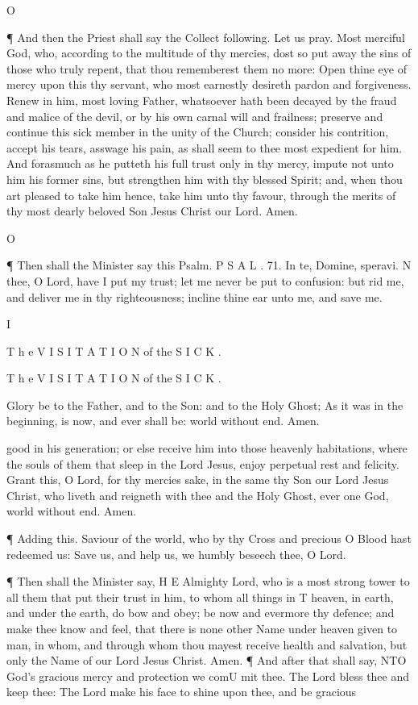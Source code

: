 O

¶ And then the Priest shall say the Collect following. Let us pray. Most merciful God, who, according to the multitude of thy mercies, dost so put away the sins of those who truly repent, that thou rememberest them no more: Open thine eye of mercy upon this thy servant, who most earnestly desireth pardon and forgiveness. Renew in him, most loving Father, whatsoever hath been decayed by the fraud and malice of the devil, or by his own carnal will and frailness; preserve and continue this sick member in the unity of the Church; consider his contrition, accept his tears, asswage his pain, as shall seem to thee most expedient for him. And forasmuch as he putteth his full trust only in thy mercy, impute not unto him his former sins, but strengthen him with thy blessed Spirit; and, when thou art pleased to take him hence, take him unto thy favour, through the merits of thy most dearly beloved Son Jesus Christ our Lord. Amen.

O

¶ Then shall the Minister say this Psalm. P S A L . 71. In te, Domine, speravi. N thee, O Lord, have I put my trust; let me never be put to confusion: but rid me, and deliver me in thy righteousness; incline thine ear unto me, and save me.

I

T h e V I S I T A T I O N of the S I C K .

T h e V I S I T A T I O N of the S I C K .

Glory be to the Father, and to the Son: and to the Holy Ghost; As it was in the beginning, is now, and ever shall be: world without end. Amen.

good in his generation; or else receive him into those heavenly habitations, where the souls of them that sleep in the Lord Jesus, enjoy perpetual rest and felicity. Grant this, O Lord, for thy mercies sake, in the same thy Son our Lord Jesus Christ, who liveth and reigneth with thee and the Holy Ghost, ever one God, world without end. Amen.

¶ Adding this. Saviour of the world, who by thy Cross and precious O Blood hast redeemed us: Save us, and help us, we humbly beseech thee, O Lord.

¶ Then shall the Minister say, H E Almighty Lord, who is a most strong tower to all them that put their trust in him, to whom all things in T heaven, in earth, and under the earth, do bow and obey; be now and evermore thy defence; and make thee know and feel, that there is none other Name under heaven given to man, in whom, and through whom thou mayest receive health and salvation, but only the Name of our Lord Jesus Christ. Amen. ¶ And after that shall say, NTO God’s gracious mercy and protection we comU mit thee. The Lord bless thee and keep thee: The Lord make his face to shine upon thee, and be gracious

